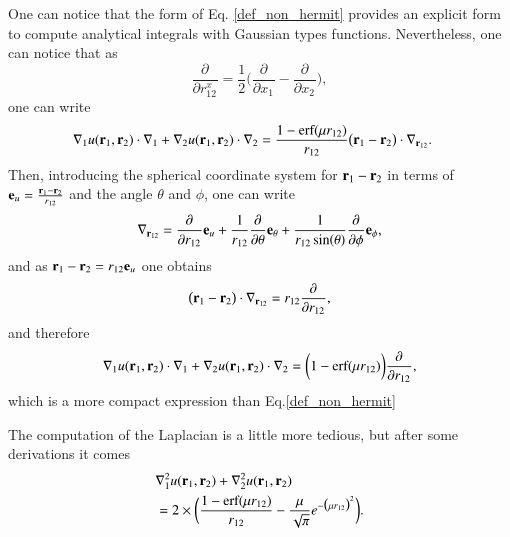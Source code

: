 \documentclass[aip,jcp,reprint,noshowkeys,superscriptaddress]{revtex4-1}
\newcommand{\deriv}[3]{\frac{\partial^{#3} #1}{\partial {#2}^{#3}}}
\newcommand{\br}[0]{{\bf {r}}}
\newcommand{\bri}[1]{{\bf r}_{#1}}
\begin{document}
One can notice that the form of Eq. \eqref{def_non_hermit} provides an explicit form to compute analytical integrals with Gaussian types functions. 
Nevertheless, one can notice that as 
\begin{equation}
 \deriv{}{r_{12}^x}{} = \frac{1}{2} \bigg( \deriv{}{x_1}{} - \deriv{}{x_2}{} \bigg),
\end{equation}
one can write 
\begin{equation}
 \begin{aligned}
 \label{eq:nabla_i_nabla0}
& \nabla_1 u(\br{}_1,\br{}_2) \cdot \nabla_1 + \nabla_2 u(\br{}_1,\br{}_2) \cdot \nabla_2 = \frac{1 - \text{erf}(\mu r_{12})}{r_{12}} \big( \br{}_1 - \br{}_2 \big) \cdot \nabla_{\br{}_{12}}.
 \end{aligned}
\end{equation}
Then, introducing the spherical coordinate system for $\br{}_1 - \br{}_2$ in terms of ${\bf e}_u= \frac{\br{}_1 - \br{}_2}{r_{12}}$ and the angle $\theta$ and $\phi$, one can write 
\begin{equation}
 \nabla_{\br{}_{12}} = \deriv{}{r_{12}}{} {\bf e}_u + \frac{1}{r_{12}} \deriv{}{\theta}{} {\bf e}_{\theta} + \frac{1}{r_{12} \sin(\theta)} \deriv{}{\phi}{} {\bf e}_\phi,
\end{equation}
and as $\br{}_1 - \br{}_2 = r_{12} {\bf e}_u$ one obtains
\begin{equation}
 \big( \br{}_1 - \br{}_2 \big) \cdot \nabla_{\br{}_{12}} = r_{12} \deriv{}{r_{12}}{},
\end{equation}
and therefore 
\begin{equation}
 \begin{aligned}
 \label{eq:nabla_i_nabla1}
 \nabla_1 u(\br{}_1,\br{}_2) \cdot \nabla_1 + \nabla_2 u(\br{}_1,\br{}_2) \cdot \nabla_2 = \bigg( 1 - \text{erf}(\mu r_{12})\bigg) \deriv{}{r_{12}}{},
 \end{aligned}
\end{equation}
which is a more compact expression than Eq.\eqref{def_non_hermit}

The computation of the Laplacian is a little more tedious, but after some derivations it comes  
\begin{equation}
 \begin{aligned}
 \label{eq:d2_x1_2}
 &\nabla_1^2 u(\bri{1},\bri{2}) + \nabla_2^2u(\bri{1},\bri{2})\\ 
 & = 2 \times \bigg( \frac{1 - \text{erf}(\mu r_{12})}{r_{12}} - \frac{\mu}{\sqrt{\pi}} e^{-\big(\mu r_{12} \big)^2}  \bigg).
 \end{aligned}
\end{equation}
\end{document}
